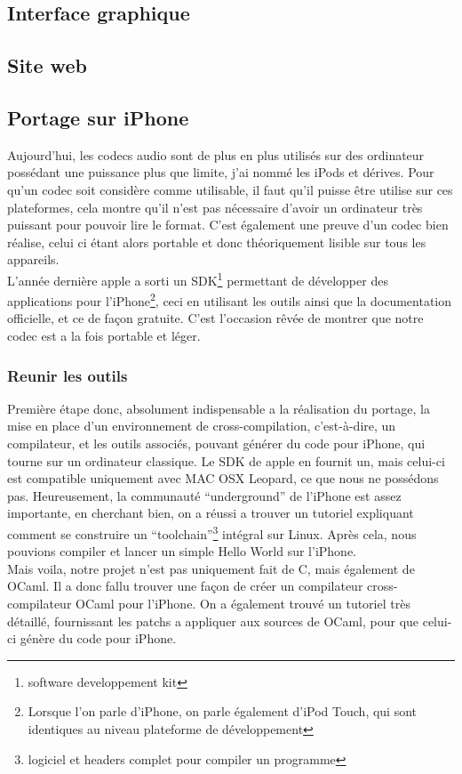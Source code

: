 \documentclass[a4paper,12pt]{article}
\begin{document}
	\subsection{Interface graphique}
	\subsection{Site web}
	\subsection{Portage sur iPhone}
Aujourd'hui, les codecs audio sont de plus en plus utilisés sur des
ordinateur possédant une puissance plus que limite, j'ai nommé les iPods
et dérives. Pour qu'un codec soit considère comme utilisable, il faut
qu'il puisse être utilise sur ces plateformes, cela montre qu'il n'est
pas nécessaire d'avoir un ordinateur très puissant pour pouvoir lire le
format. C'est également une preuve d'un codec bien réalise, celui ci
étant alors portable et donc théoriquement lisible sur tous les
appareils.\\
L'année dernière apple a sorti un SDK\footnote{software developpement
kit} permettant de développer des applications pour l'iPhone\footnote{Lorsque
l'on parle d'iPhone, on parle également d'iPod Touch, qui sont identiques au
niveau plateforme de développement}, ceci en
utilisant les outils ainsi que la documentation officielle, et ce de façon gratuite.
C'est l'occasion rêvée de montrer que notre codec est a la fois
portable et léger.\\
		\subsubsection{Reunir les outils}
Première étape donc, absolument indispensable a la réalisation du
portage, la mise en place d'un environnement de cross-compilation,
c'est-à-dire, un compilateur, et les outils associés,  pouvant générer du code
pour iPhone, qui
tourne sur un ordinateur classique. Le SDK de apple en fournit un, mais
celui-ci est compatible uniquement avec MAC OSX Leopard, ce que nous ne
possédons pas. Heureusement, la communauté ``underground'' de l'iPhone
est assez importante, en cherchant bien, on a réussi a trouver un
tutoriel expliquant comment se construire un
``toolchain''\footnote{logiciel et headers complet pour compiler un
programme} intégral sur Linux. Après cela, nous pouvions compiler et lancer un
simple Hello World sur l'iPhone.\\
Mais voila, notre projet n'est pas uniquement fait de C, mais également
de OCaml. Il a donc fallu trouver une façon de créer un compilateur
cross-compilateur OCaml
pour l'iPhone. On a également trouvé un tutoriel très détaillé, fournissant les
patchs a appliquer aux sources de OCaml, pour que celui-ci génère du code pour
iPhone.
\end{document}
